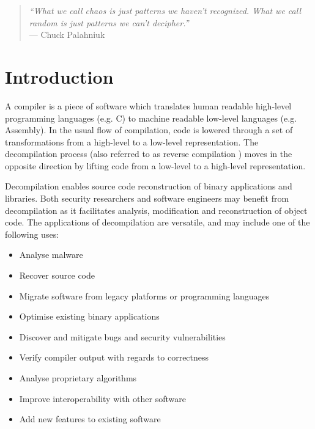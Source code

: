 
\begin{quote}
	\textit{``What we call chaos is just patterns we haven't recognized. What we call random is just patterns we can't decipher.''} \\ --- Chuck Palahniuk \cite{patterns_quote}
\end{quote}

\section{Introduction}
\label{sec:introduction}

A compiler is a piece of software which translates human readable high-level programming languages (e.g. C) to machine readable low-level languages (e.g. Assembly). In the usual flow of compilation, code is lowered through a set of transformations from a high-level to a low-level representation. The decompilation process (also referred to as reverse compilation \cite{reverse_comp}) moves in the opposite direction by lifting code from a low-level to a high-level representation.

Decompilation enables source code reconstruction of binary applications and libraries. Both security researchers and software engineers may benefit from decompilation as it facilitates analysis, modification and reconstruction of object code. The applications of decompilation are versatile, and may include one of the following uses:

\begin{itemize}
	\item Analyse malware
	\item Recover source code
	\item Migrate software from legacy platforms or programming languages
	\item Optimise existing binary applications
	\item Discover and mitigate bugs and security vulnerabilities
	\item Verify compiler output with regards to correctness
	\item Analyse proprietary algorithms
	\item Improve interoperability with other software
	\item Add new features to existing software
\end{itemize}

